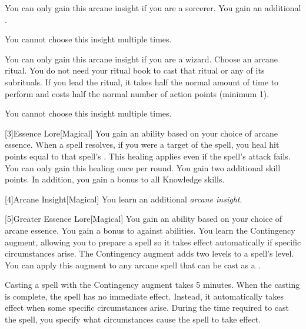 {             You can only gain this arcane insight if you are a sorcerer.
            You gain an additional .
            \par You cannot choose this insight multiple times.

             You can only gain this arcane insight if you are a wizard.
            Choose an arcane ritual.
            You do not need your ritual book to cast that ritual or any of its subrituals.
            If you lead the ritual, it takes half the normal amount of time to perform and costs half the normal number of action points (minimum 1).
            \par You cannot choose this insight multiple times.
        }

        [3]{Essence Lore}[Magical]
        You gain an ability based on your choice of arcane essence.
         When a spell resolves, if you were a target of the spell, you heal hit points equal to that spell's .
        This healing applies even if the spell's attack fails.
        You can only gain this healing once per round.
         You gain two additional skill points.
        In addition, you gain a  bonus to all Knowledge skills.

        [4]{Arcane Insight}[Magical]
        You learn an additional \textit{arcane insight}.

        [5]{Greater Essence Lore}[Magical]
        You gain an ability based on your choice of arcane essence.
         You gain a  bonus to  against  abilities.
         You learn the Contingency augment, allowing you to prepare a spell so it takes effect automatically if specific circumstances arise.
        The Contingency augment adds two levels to a spell's level.
        You can apply this augment to any arcane spell that can be cast as a .

        Casting a spell with the Contingency augment takes 5 minutes.
        When the casting is complete, the spell has no immediate effect.
        Instead, it automatically takes effect when some specific circumstances arise.
        During the time required to cast the spell, you specify what circumstances cause the spell to take effect.

